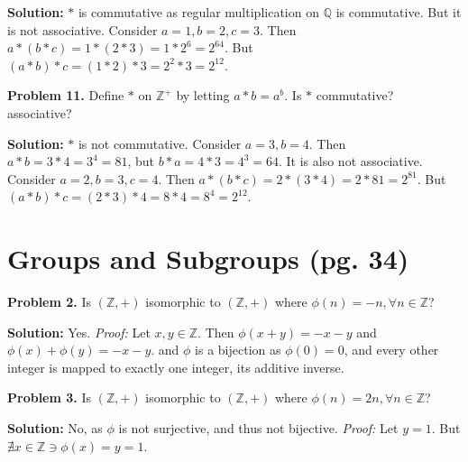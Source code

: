 \documentclass[12pt, letterpaper]{article}
\newenvironment{problem}
    [1]
    {\noindent \textbf{Problem #1.}}
    {\vspace{3mm}}
\newenvironment{solution}
    [0]
    {\noindent \textbf{Solution:}} 
    {\vspace{3mm}}
\begin{document}
    \begin{solution}
        $*$ is commutative as regular multiplication on $\mathbb{Q}$ is commutative.
        But it is not associative. Consider $a=1, b=2, c=3$. Then $a * (b * c) = 
        1 * (2 * 3) = 1 * 2^6 = 2^{64}$. But $(a * b) * c = (1 * 2) * 3 = 2^2 * 3 =
        2^{12}$.
    \end{solution}

    \begin{problem}{11}
        Define $*$ on $\mathbb{Z}^+$ by letting $a*b=a^b$. Is $*$ commutative?
        associative?
    \end{problem}

    \begin{solution}
        $*$ is not commutative. Consider $a=3,b=4$. Then $a * b = 3 * 4 = 3^4 = 81$,
        but $b * a = 4 * 3 = 4^3 = 64$. It is also not associative. Consider 
        $a=2, b=3, c=4$. Then $a * (b * c) = 2 * (3 * 4) = 2 * 81 = 2^{81}$. 
        But $(a * b) * c = (2 * 3) * 4 = 8 * 4 = 8^4 = 2^{12}$.
    \end{solution}

\section{Groups and Subgroups (pg. 34)}
    \begin{problem}{2}
        Is $(\mathbb{Z}, +)$ isomorphic to $(\mathbb{Z}, +)$ where $\phi(n)=-n, \forall n \in \mathbb{Z}$?
    \end{problem}

    \begin{solution}
        Yes. \emph{Proof:} Let $x, y \in \mathbb{Z}$. Then $\phi(x + y)=-x-y$ and $\phi(x)+\phi(y)=-x-y$.
        and $\phi$ is a bijection as $\phi(0) = 0$, and every other integer is mapped to exactly one integer,
        its additive inverse.
    \end{solution}

    \begin{problem}{3}
        Is $(\mathbb{Z}, +)$ isomorphic to $(\mathbb{Z}, +)$ where $\phi(n)=2n, \forall n \in \mathbb{Z}$?
    \end{problem}

    \begin{solution}
        No, as $\phi$ is not surjective, and thus not bijective. \emph{Proof:} Let $y = 1$.
        But $\nexists x \in \mathbb{Z} \ni \phi(x) = y = 1$.
    \end{solution}
\end{document}
